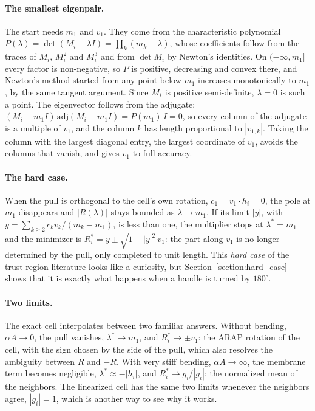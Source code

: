 \documentclass{birkjour}
\theoremstyle{remark}
\numberwithin{equation}{section}
\begin{document}
\paragraph{The smallest eigenpair.} The start needs $m_1$ and $v_1$. They come from the characteristic polynomial $P(\lambda) = \det(M_i - \lambda I) = \prod_k (m_k - \lambda)$, whose coefficients follow from the traces of $M_i$, $M_i^2$ and $M_i^3$ and from $\det M_i$ by Newton's identities. On $(-\infty, m_1]$ every factor is non-negative, so $P$ is positive, decreasing and convex there, and Newton's method started from any point below $m_1$ increases monotonically to $m_1$, by the same tangent argument. Since $M_i$ is positive semi-definite, $\lambda = 0$ is such a point. The eigenvector follows from the adjugate: $(M_i - m_1 I) \, \mathrm{adj}(M_i - m_1 I) = P(m_1) \, I = 0$, so every column of the adjugate is a multiple of $v_1$, and the column $k$ has length proportional to $|v_{1,k}|$. Taking the column with the largest diagonal entry, the largest coordinate of $v_1$, avoids the columns that vanish, and gives $v_1$ to full accuracy.

\paragraph{The hard case.} When the pull is orthogonal to the cell's own rotation, $c_1 = v_1 \cdot h_i = 0$, the pole at $m_1$ disappears and $|R(\lambda)|$ stays bounded as $\lambda \to m_1$. If its limit $|y|$, with $y = \sum_{k \geq 2} c_k v_k / (m_k - m_1)$, is less than one, the multiplier stops at $\lambda^* = m_1$ and the minimizer is $R^*_i = y \pm \sqrt{1 - |y|^2} \, v_1$: the part along $v_1$ is no longer determined by the pull, only completed to unit length. This \emph{hard case} of the trust-region literature \cite{MoreSorensen1983} looks like a curiosity, but Section~\ref{section:hard_case} shows that it is exactly what happens when a handle is turned by $180^\circ$.

\paragraph{Two limits.} The exact cell interpolates between two familiar answers. Without bending, $\alpha A \to 0$, the pull vanishes, $\lambda^* \to m_1$, and $R^*_i \to \pm v_1$: the ARAP rotation of the cell, with the sign chosen by the side of the pull, which also resolves the ambiguity between $R$ and $-R$. With very stiff bending, $\alpha A \to \infty$, the membrane term becomes negligible, $\lambda^* \approx -|h_i|$, and $R^*_i \to g_i / |g_i|$: the normalized mean of the neighbors. The linearized cell has the same two limits whenever the neighbors agree, $|g_i| = 1$, which is another way to see why it works.
\end{document}
